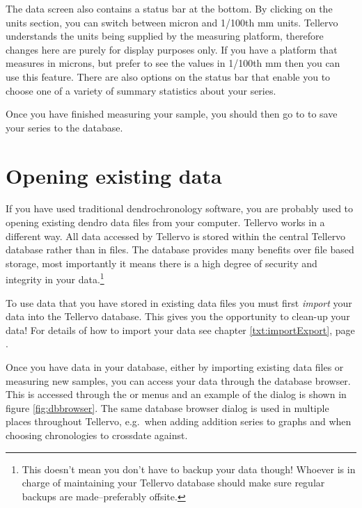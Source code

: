 The data screen also contains a status bar at the bottom. By clicking on the units section, you can switch between micron and 1/100th mm units. Tellervo understands the units being supplied by the measuring platform, therefore changes here are purely for display purposes only. If you have a platform that measures in microns, but prefer to see the values in 1/100th mm then you can use this feature.  There are also options on the status bar that enable you to choose one of a variety of summary statistics about your series.

Once you have finished measuring your sample, you should then go to  to save your series to the database. 


\section{Opening existing data}
If you have used traditional dendrochronology software, you are probably used to opening existing dendro data files from your computer.  Tellervo works in a different way.  All data accessed by Tellervo is stored within the central Tellervo database rather than in files.  The database provides many benefits over file based storage, most importantly it means there is a high degree of security and integrity in your data.\footnote{This doesn't mean you don't have to backup your data though!  Whoever is in charge of maintaining your Tellervo database should make sure regular backups are made--preferably offsite.}

To use data that you have stored in existing data files you must first \emph{import} your data into the Tellervo database.  This gives you the opportunity to clean-up your data!  For details of how to import your data see chapter \ref{txt:importExport}, page \pageref{txt:importExport}.

Once you have data in your database, either by importing existing data files or measuring new samples, you can access your data through the database browser.  This is accessed through the  or  menus and an example of the dialog is shown in figure \ref{fig:dbbrowser}. The same database browser dialog is used in multiple places throughout Tellervo, e.g.\ when adding addition series to graphs and when choosing chronologies to crossdate against. 

